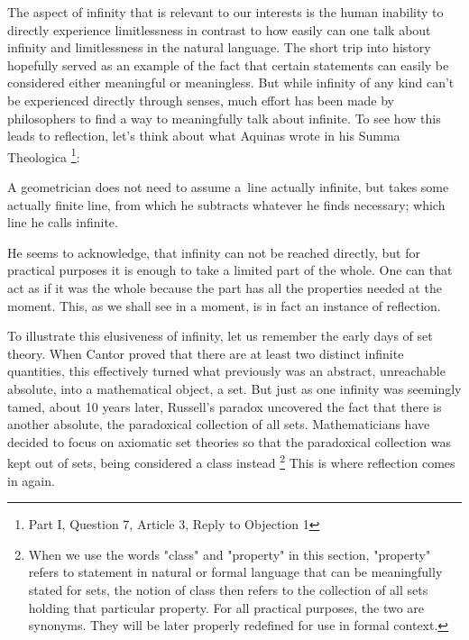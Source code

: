 The aspect of infinity that is relevant to our interests is the human inability to directly experience limitlessness in contrast to how easily can one talk about infinity and limitlessness in the natural language. The short trip into history hopefully served as an example of the fact that certain statements can easily be considered either meaningful or meaningless. 
But while infinity of any kind can't be experienced directly through senses, much effort has been made by philosophers to find a way to meaningfully talk about infinite. 
To see how this leads to reflection, let's think about what Aquinas wrote in his Summa Theologica \footnote{Part I, Question 7, Article 3, Reply to Objection 1}:
\begin{displayquote}
A geometrician does not need to assume a~line actually infinite, but takes some actually finite line, from which he subtracts whatever he finds necessary; which line he calls infinite.
\end{displayquote}
He seems to acknowledge, that infinity can not be reached directly, but for practical purposes it is enough to take a limited part of the whole. One can that act as if it was the whole because the part has all the properties needed at the moment. This, as we shall see in a moment, is in fact an instance of reflection.


To illustrate this elusiveness of infinity, let us remember the early days of set theory. When Cantor proved that there are at least two distinct infinite quantities, this effectively turned what previously was an abstract, unreachable absolute, into a mathematical object, a set. But just as one infinity was seemingly tamed, about 10 years later, Russell's paradox uncovered the fact that there is another absolute, the paradoxical collection of all sets. Mathematicians have decided to focus on axiomatic set theories so that the paradoxical collection was kept out of sets, being considered a class instead \footnote{When we use the words "class" and "property" in this section, "property" refers to statement in natural or formal language that can be meaningfully stated for sets, the notion of class then refers to the collection of all sets holding that particular property. For all practical purposes, the two are synonyms. They will be later properly redefined for use in formal context.}
This is where reflection comes in again. 

